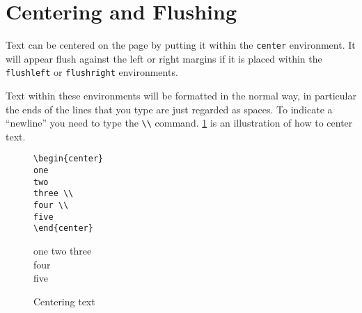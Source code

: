 \section{Centering and Flushing}
Text can be centered on the page by putting it within the {\tt center}
environment.
It will appear flush against the left or right margins if it
is placed within the {\tt flushleft} or {\tt flushright} environments.
 
Text within these environments will be formatted in the normal way, in
particular the ends of the lines that you type are just regarded as
spaces.  To
indicate a ``newline'' you need to type the \verb|\\| command.
\ref{fig:center} is an illustration of how to center text.
\begin{figure}
\footnotesize
\begin{minipage}[t]{0.48\textwidth}
\begin{verbatim}
\begin{center}
one
two
three \\
four \\
five
\end{center}
\end{verbatim}
\end{minipage}\hfill
\begin{minipage}[t]{0.48\textwidth}
\begin{center}
one
two
three \\
four \\
five
\end{center}
\end{minipage}
\vspace{1em}
\caption{Centering text}\label{fig:center}
\end{figure}
 
